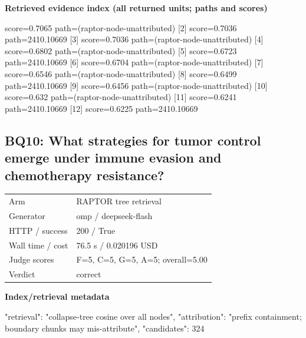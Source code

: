 \documentclass[10pt]{article}
\begin{document}
\textbf{Retrieved evidence index (all returned units; paths and scores) }
\begin{EvidenceText}
[1] score=0.7065 path=(raptor-node-unattributed)
[2] score=0.7036 path=2410.10669
[3] score=0.7036 path=(raptor-node-unattributed)
[4] score=0.6802 path=(raptor-node-unattributed)
[5] score=0.6723 path=2410.10669
[6] score=0.6704 path=(raptor-node-unattributed)
[7] score=0.6546 path=(raptor-node-unattributed)
[8] score=0.6499 path=2410.10669
[9] score=0.6456 path=(raptor-node-unattributed)
[10] score=0.632 path=(raptor-node-unattributed)
[11] score=0.6241 path=2410.10669
[12] score=0.6225 path=2410.10669
\end{EvidenceText}
\subsection{BQ10: What strategies for tumor control emerge under immune evasion and chemotherapy resistance?}
\begin{tabular}{@{}ll@{}}
Arm & RAPTOR tree retrieval\\
Generator & omp / deepseek-flash\\
HTTP / success & 200 / True\\
Wall time / cost & 76.5 s / 0.020196 USD\\
Judge scores & F=5, C=5, G=5, A=5; overall=5.00\\
Verdict & correct\\
\end{tabular}

\textbf{Index/retrieval metadata}
\begin{EvidenceText}
{
  "retrieval": "collapse-tree cosine over all nodes",
  "attribution": "prefix containment; boundary chunks may mis-attribute",
  "candidates": 324
}
\end{EvidenceText}
\end{document}
